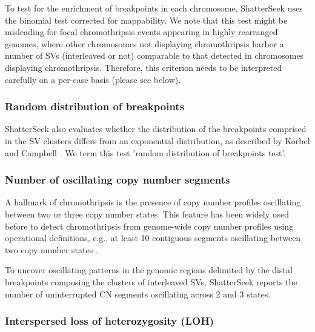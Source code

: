 \documentclass[twoside,a4wide,11pt]{article}\usepackage[]{graphicx}\usepackage[]{color}
\begin{document}
To test for the enrichment of breakpoints in each chromosome,
ShatterSeek uses the binomial test corrected for mappability. 
We note that this test might be misleading for focal chromothripsis events
appearing in highly rearranged genomes, where
other chromosomes not displaying chromothripsis harbor a number of SVs (interleaved or not) comparable to that
detected in chromosomes displaying chromothripsis. 
Therefore, this criterion needs to be interpreted carefully on a per-case basis (please see below).

\subsubsection{Random distribution of breakpoints}
ShatterSeek also evaluates whether the distribution of the breakpoints comprised in the SV clusters
differs from an exponential distribution, as described by Korbel and Campbell \cite{Korbel2013}.
We term this test 'random distribution of breakpoints test'.

\subsubsection{Number of oscillating copy number segments}
A hallmark of chromothripsis is the 
presence of copy number profiles oscillating between two or three copy number states.
This feature has been widely used before to detect chromothripsis from 
genome-wide copy number profiles using operational definitions,
e.g., at least 10 contiguous segments oscillating between two copy number states \cite{Rausch2012}. 

To uncover oscillating patterns in the genomic regions delimited by the distal breakpoints composing 
the clusters of interleaved SVs,
ShatterSeek reports the number of uninterrupted CN segments oscillating across 2 and 3 states.

\subsubsection{Interspersed loss of heterozygosity (LOH)}
\end{document}
